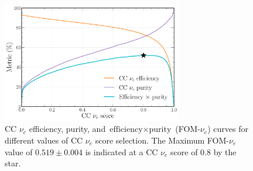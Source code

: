 \begin{figure} %
    \includegraphics[width=0.7\textwidth]{diagrams/7-results/final_nuel_eff_curves.pdf}
    \caption[CC $\nu_{e}$ efficiency, purity, and $\text{efficiency}\times\text{purity}$ curves]
    {CC $\nu_{e}$ efficiency, purity, and $\text{efficiency}\times\text{purity}$ (FOM-$\nu_e$)
        curves for different values of CC $\nu_{e}$ score selection. The Maximum FOM-$\nu_e$ value
        of $0.519\pm0.004$ is indicated at a CC $\nu_{e}$ score of $0.8$ by the star.}
    \label{fig:final_nuel_eff_curves}
\end{figure}

\begin{table}
    \caption[Table showing CC $\nu_{e}$ selected event numbers, efficiencies and purities]
    {Table showing CC $\nu_{e}$ selected event numbers and corresponding efficiencies for the
        various event categories as well as associated purities. Shown are the total event
        numbers, those after the preselection, \emph{cosmic score} cut, and \emph{escapes score}
        cut (Cuts), in addition to the numbers after the FOM-$\nu_e$ optimised selection with the
        efficiencies relative to the total number of events shown for both. Both the appeared
        signal CC $\nu_{e}$ purity and the joint appeared and beam CC $\nu_{e}$ purity are shown
        for each selection.}
    \label{tab:nuel_selection}
\end{table}

